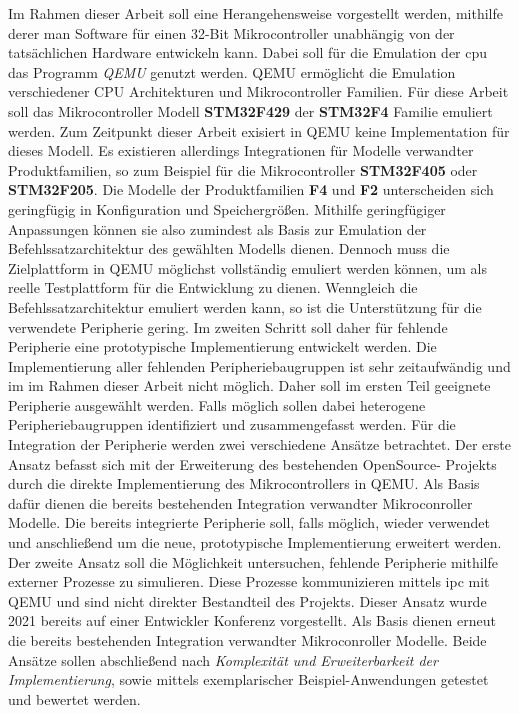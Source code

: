 Im Rahmen dieser Arbeit soll eine Herangehensweise vorgestellt werden, mithilfe
derer man Software für einen 32-Bit Mikrocontroller unabhängig von der
tatsächlichen Hardware entwickeln kann.
Dabei soll für die Emulation der \ac{cpu} das Programm \textit{QEMU} genutzt
werden.
QEMU ermöglicht die Emulation verschiedener CPU Architekturen und
Mikrocontroller Familien.\newline
Für diese Arbeit soll das Mikrocontroller Modell \textbf{STM32F429} der
\textbf{STM32F4} Familie emuliert werden.
Zum Zeitpunkt dieser Arbeit exisiert in QEMU keine Implementation für dieses
Modell.
Es existieren allerdings Integrationen für Modelle verwandter Produktfamilien,
so zum Beispiel für die Mikrocontroller \textbf{STM32F405} oder
\textbf{STM32F205}\cite{QemuSTMDoku}.
Die Modelle der Produktfamilien \textbf{F4} und \textbf{F2} unterscheiden sich
geringfügig in Konfiguration und Speichergrößen.
Mithilfe geringfügiger Anpassungen können sie also zumindest als Basis zur
Emulation der Befehlssatzarchitektur des gewählten Modells dienen.
Dennoch muss die Zielplattform in QEMU möglichst vollständig emuliert werden
können, um als reelle Testplattform für die Entwicklung zu dienen.
Wenngleich die Befehlssatzarchitektur emuliert werden kann, so ist die
Unterstützung für die verwendete Peripherie gering.\newline
Im zweiten Schritt soll daher für fehlende Peripherie eine prototypische
Implementierung entwickelt werden.
Die Implementierung aller fehlenden Peripheriebaugruppen ist sehr zeitaufwändig
und im im Rahmen dieser Arbeit nicht möglich.
Daher soll im ersten Teil geeignete Peripherie ausgewählt werden.
Falls möglich sollen dabei heterogene Peripheriebaugruppen identifiziert und
zusammengefasst werden.
Für die Integration der Peripherie werden zwei verschiedene Ansätze
betrachtet.\newline
Der erste Ansatz befasst sich mit der Erweiterung des bestehenden OpenSource-
Projekts durch die direkte Implementierung des Mikrocontrollers in QEMU.
Als Basis dafür dienen die bereits bestehenden Integration verwandter
Mikroconroller Modelle.
Die bereits integrierte Peripherie soll, falls möglich, wieder verwendet und
anschließend um die neue, prototypische Implementierung erweitert
werden.\newline
Der zweite Ansatz soll die Möglichkeit untersuchen, fehlende Peripherie
mithilfe externer Prozesse zu simulieren.
Diese Prozesse kommunizieren mittels \ac{ipc} mit QEMU und sind nicht direkter
Bestandteil des Projekts.
Dieser Ansatz wurde 2021 bereits auf einer Entwickler Konferenz vorgestellt.
\cite{KplCodeDive}
Als Basis dienen erneut die bereits bestehenden Integration verwandter
Mikroconroller Modelle.
Beide Ansätze sollen abschließend nach \textit{Komplexität und Erweiterbarkeit
der Implementierung}, sowie mittels exemplarischer Beispiel-Anwendungen
getestet und bewertet werden.

